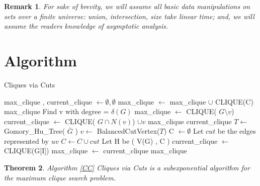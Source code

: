 \documentclass[12pt]{article}
\newtheorem{thm}{Theorem}[section]
\newtheorem{rem}[thm]{Remark}
\begin{document}
\begin{rem}\label{brevity} For sake of brevity, we will assume all basic data manipulations on sets over a finite universe: union, intersection, size take linear time; and, we will assume the readers knowledge of asymptotic analysis.
\end{rem}

\section{Algorithm}

\begin{algorithm}
\caption{Cliques via Cuts\label{CC} } 
\begin{algorithmic}[1]
\State max\_clique , current\_clique $\gets \emptyset, \emptyset$
\State max\_clique $\gets$ max\_clique $\cup$ CLIQUE(C)
\EndFor
\State \Return max\_clique
\EndIf
{}
\State Find v with degree = $\delta(G)$
\State max\_clique $\gets$ CLIQUE( $G \setminus v$)
\State current\_clique $\gets$ CLIQUE( $G \cap N(v) $) $\cup v$
 {\Return max\_clique} \EndIf \Return current\_clique
\EndIf
\State $ T \gets$ Gomory\_Hu\_Tree( $\bar{G}$ )
\State $ v \gets$ BalancedCutVertex($T$)
\State C $\gets \emptyset $
\State Let $cut$ be the edges represented by $uv$
\State $C \gets C \cup cut $
\EndFor
\State Let H be ( V(G) , C )
\State current\_clique $\gets$ CLIQUE(G[I])
max\_clique $\gets$ current\_clique \EndIf
\EndFor
\State \Return max\_clique
\EndProcedure
\end{algorithmic}
\end{algorithm}

\begin{thm} \label{main} Algorithm \ref{CC} Cliques via Cuts  is a subexponential algorithm for the maximum clique search problem. \end{thm}
\end{document}
